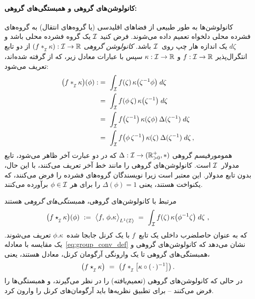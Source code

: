 \paragraph{کانولوشن‌های گروهی و همبستگی‌های گروهی:}
کانولوشن‌ها به طور طبیعی از فضاهای اقلیدسی (یا گروه‌های انتقال) به گروه‌های فشرده محلی دلخواه تعمیم داده می‌شوند.
فرض کنید $\mathcal{I}$ یک گروه فشرده محلی باشد و $d\zeta$ یک اندازه هار چپ روی~$\mathcal{I}$ باشد.
\emph{کانولوشن گروهی} $(f \ast_{\overset{}{\protect\scalebox{.64}{$\mkern-.5mu \I$}}} \kappa): \I \to \R$ از دو تابع انتگرال‌پذیر $f:\mathcal{I}\to\mathbb{R}$ و $\kappa:\mathcal{I}\to\mathbb{R}$ سپس با عبارات معادل زیر، که از \cite{gallier2019harmonicRepr} گرفته شده‌اند، تعریف می‌شود:
\begin{align}\label{eq:group_conv_def}
	\big(f \ast_{\overset{}{\protect\scalebox{.64}{$\mkern-.5mu \I$}}} \kappa \big)(\phi)
	:&=\ \int_{\I} f(\zeta)\, \kappa\big( \zeta^{-1} \phi \big) \; d\zeta \notag \\
	&=\ \int_{\I} f(\phi\, \zeta)\, \kappa\big( \zeta^{-1}\big) \; d\zeta \notag \\
	&=\ \int_{\I} f\big(\zeta^{-1} \big)\, \kappa( \zeta\phi)\: \Delta(\zeta^{-1}) \; d\zeta \notag \\
	&=\ \int_{\I} f\big(\phi\, \zeta^{-1} \big)\, \kappa( \zeta)\: \Delta(\zeta^{-1}) \; d\zeta \,,
\end{align}
همومورفیسم گروهی $\Delta: \mathcal{I} \to (\mathbb{R}^+_{>0},*)$ که در دو عبارت آخر ظاهر می‌شود، تابع مدولار~$\mathcal{I}$ است.
\citet{Kondor2018-GENERAL} کانولوشن‌های گروهی را مانند خط آخر تعریف می‌کنند، با این حال، بدون تابع مدولار.
این معتبر است زیرا نویسندگان گروه‌های فشرده را فرض می‌کنند، که یکنواخت هستند، یعنی $\Delta(\phi) = 1$ را برای هر $\phi \in\mathcal{I}$ برآورده می‌کنند.


مرتبط با کانولوشن‌های گروهی، \emph{همبستگی‌های گروهی} هستند
\begin{align}\label{eq:group_corr_def}
	\big(f \star_{\overset{}{\protect\scalebox{.64}{$\mkern-.5mu \I$}}} \kappa \big)(\phi)
	\ :=\ \big\langle f,\, \phi.\kappa \big\rangle_{L^1(\I)}
	\ =\ \int_{\I} f(\zeta)\, \kappa\big( \phi^{-1} \zeta \big) \; d\zeta\ ,
\end{align}
که به عنوان حاصلضرب داخلی یک تابع~$f$ با یک کرنل جابجا شده~$\phi.\kappa$ تعریف می‌شوند.
یک مقایسه با معادله~\eqref{eq:group_conv_def} نشان می‌دهد که کانولوشن‌های گروهی و همبستگی‌های گروهی تا یک وارونگی آرگومان کرنل، معادل هستند، یعنی،
\begin{align}\label{eq:group_conv_corr_kernel_inversion}
	\big(f \star_{\overset{}{\protect\scalebox{.64}{$\mkern-.5mu \I$}}} \kappa \big)
	\ =\ \big(f \ast_{\overset{}{\protect\scalebox{.64}{$\mkern-.5mu \I$}}} \big[\kappa \circ (\,\cdot\,)^{-1} \big] \big) \,.
\end{align}
در حالی که \citet{Kondor2018-GENERAL} کانولوشن‌های گروهی (تعمیم‌یافته) را در نظر می‌گیرند، \citet{bekkers2020bspline} و \citet{Cohen2019-generaltheory} همبستگی‌ها را فرض می‌کنند -- برای تطبیق نظریه‌ها باید آرگومان‌های کرنل را وارون کرد.


